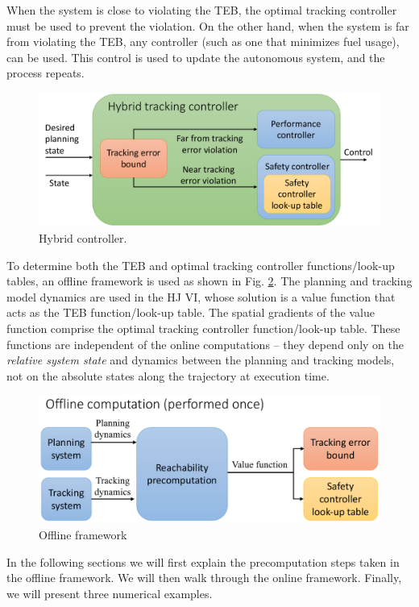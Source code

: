 When the system is close to violating the TEB, the optimal tracking controller must be used to prevent the violation. 
On the other hand, when the system is far from violating the TEB, any controller (such as one that minimizes fuel usage), can be used. 
This control is used to update the autonomous system, and the process repeats.

\begin{figure}[h!]
  \centering
	\includegraphics[width=0.9\columnwidth]{fig/hybrid_controller}
	\caption{Hybrid controller. }
	\label{fig:hybrid_ctrl}
\end{figure}

To determine both the TEB and optimal tracking controller functions/look-up tables, an offline framework is used as shown in Fig. \ref{fig:fw_offline}. 
The planning and tracking model dynamics are used in the HJ VI, whose solution is a value function that acts as the TEB function/look-up table. 
The spatial gradients of the value function comprise the optimal tracking controller function/look-up table. 
These functions are independent of the online computations -- they depend only on the \textit{relative system state} and dynamics between the planning and tracking models, not on the absolute states along the trajectory at execution time.

\begin{figure}[h!]
  \centering
	\includegraphics[width=0.9\columnwidth]{fig/framework_offline}
	\caption{Offline framework}
	\label{fig:fw_offline}
\end{figure}
In the following sections we will first explain the precomputation steps taken in the offline framework. 
We will then walk through the online framework.
Finally, we will present three numerical examples.


